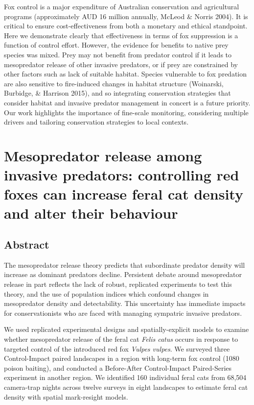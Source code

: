 \documentclass[11pt,a4paper,titlepage,twoside,openright]{style/unimelbthesis}
\begin{document}
\begin{mainmatter}
Fox control is a major expenditure of Australian conservation and agricultural programs (approximately AUD 16 million annually, McLeod \& Norris 2004). It is critical to ensure cost-effectiveness from both a monetary and ethical standpoint. Here we demonstrate clearly that effectiveness in terms of fox suppression is a function of control effort. However, the evidence for benefits to native prey species was mixed. Prey may not benefit from predator control if it leads to mesopredator release of other invasive predators, or if prey are constrained by other factors such as lack of suitable habitat. Species vulnerable to fox predation are also sensitive to fire-induced changes in habitat structure (Woinarski, Burbidge, \& Harrison 2015), and so integrating conservation strategies that consider habitat and invasive predator management in concert is a future priority. Our work highlights the importance of fine-scale monitoring, considering multiple drivers and tailoring conservation strategies to local contexts.

\hypertarget{density}{%
\chapter{Mesopredator release among invasive predators: controlling red foxes can increase feral cat density and alter their behaviour}\label{density}}

\hypertarget{abstract-2}{%
\section*{Abstract}\label{abstract-2}}

The mesopredator release theory predicts that subordinate predator density will increase as dominant predators decline. Persistent debate around mesopredator release in part reflects the lack of robust, replicated experiments to test this theory, and the use of population indices which confound changes in mesopredator density and detectability. This uncertainty has immediate impacts for conservationists who are faced with managing sympatric invasive predators.

We used replicated experimental designs and spatially-explicit models to examine whether mesopredator release of the feral cat \emph{Felis catus} occurs in response to targeted control of the introduced red fox \emph{Vulpes vulpes}. We surveyed three Control-Impact paired landscapes in a region with long-term fox control (1080 poison baiting), and conducted a Before-After Control-Impact Paired-Series experiment in another region. We identified 160 individual feral cats from 68,504 camera-trap nights across twelve surveys in eight landscapes to estimate feral cat density with spatial mark-resight models.


\end{mainmatter}
\end{document}
